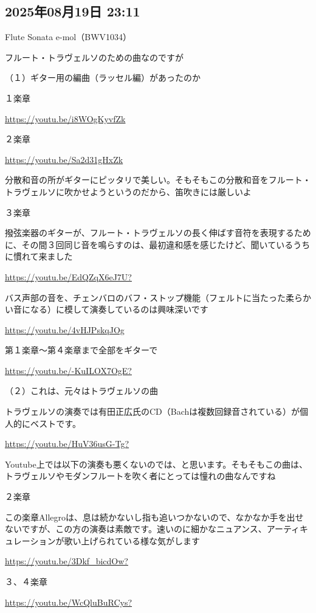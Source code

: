 \subsection*{2025年08月19日 23:11}

Flute Sonata e-mol（BWV1034）

フルート・トラヴェルソのための曲なのですが

（１）ギター用の編曲（ラッセル編）があったのか

１楽章

\url{https://youtu.be/i8WOgKyvfZk}

２楽章

\url{https://youtu.be/Sa2d31gHxZk}

分散和音の所がギターにピッタリで美しい。そもそもこの分散和音をフルート・トラヴェルソに吹かせようというのだから、笛吹きには厳しいよ

３楽章

撥弦楽器のギターが、フルート・トラヴェルソの長く伸ばす音符を表現するために、その間３回同じ音を鳴らすのは、最初違和感を感じたけど、聞いているうちに慣れて来ました

\url{https://youtu.be/EdQZqX6eJ7U?}

バス声部の音を、チェンバロのバフ・ストップ機能（フェルトに当たった柔らかい音になる）に模して演奏しているのは興味深いです

\url{https://youtu.be/4vHJPskqJOg}

第１楽章〜第４楽章まで全部をギターで

\url{https://youtu.be/-KuILOX7OgE?}

（２）これは、元々はトラヴェルソの曲

トラヴェルソの演奏では有田正広氏のCD（Bachは複数回録音されている）が個人的にベストです。

\url{https://youtu.be/HuV36usG-Tg?}

Youtube上では以下の演奏も悪くないのでは、と思います。そもそもこの曲は、トラヴェルソやモダンフルートを吹く者にとっては憧れの曲なんですね

２楽章

この楽章Allegroは、息は続かないし指も追いつかないので、なかなか手を出せないですが、この方の演奏は素敵です。速いのに細かなニュアンス、アーティキュレーションが歌い上げられている様な気がします

\url{https://youtu.be/3Dkf_bicdOw?}

３、４楽章

\url{https://youtu.be/WcQluBuRCys?}

